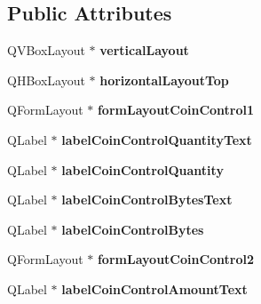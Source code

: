 \subsection*{Public Attributes}
\begin{DoxyCompactItemize}
\item 
\mbox{\label{class_ui___coin_control_dialog_af730fb3829ed02872b4f910afe40a62d}} 
Q\+V\+Box\+Layout $\ast$ {\bfseries vertical\+Layout}
\item 
\mbox{\label{class_ui___coin_control_dialog_a5cb4d1fd8e29362fd619dbe3bcb0a3b9}} 
Q\+H\+Box\+Layout $\ast$ {\bfseries horizontal\+Layout\+Top}
\item 
\mbox{\label{class_ui___coin_control_dialog_a9febff643428f66c779dce6411d377a6}} 
Q\+Form\+Layout $\ast$ {\bfseries form\+Layout\+Coin\+Control1}
\item 
\mbox{\label{class_ui___coin_control_dialog_ae66ec60d07091b040b1e61a8911f9454}} 
Q\+Label $\ast$ {\bfseries label\+Coin\+Control\+Quantity\+Text}
\item 
\mbox{\label{class_ui___coin_control_dialog_a713d9bae7c0a81fe85e08e4dd26c83ec}} 
Q\+Label $\ast$ {\bfseries label\+Coin\+Control\+Quantity}
\item 
\mbox{\label{class_ui___coin_control_dialog_a5aeed879019585e1f43a7b3976d968f1}} 
Q\+Label $\ast$ {\bfseries label\+Coin\+Control\+Bytes\+Text}
\item 
\mbox{\label{class_ui___coin_control_dialog_a90601c3e5ccb1eb95077677a9aef5255}} 
Q\+Label $\ast$ {\bfseries label\+Coin\+Control\+Bytes}
\item 
\mbox{\label{class_ui___coin_control_dialog_a1e43344156d217e842a1b51af8d6c87d}} 
Q\+Form\+Layout $\ast$ {\bfseries form\+Layout\+Coin\+Control2}
\item 
\mbox{\label{class_ui___coin_control_dialog_ab23b476f4dbad9ce8fcd2eee47d08341}} 
Q\+Label $\ast$ {\bfseries label\+Coin\+Control\+Amount\+Text}

\end{DoxyCompactItemize}
